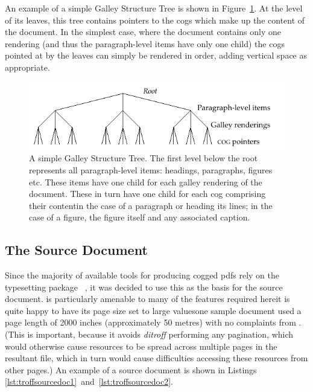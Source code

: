An example of a simple Galley Structure Tree is shown in Figure~\ref{fig:tree}. At the level of its leaves, this tree contains pointers to the \glspl{cog} which make up the content of the document. In the simplest case, where the document contains only one rendering (and thus the pa\-ra\-graph-level items have only one child) the \glspl{cog} pointed at by the leaves can simply be rendered in order, adding vertical space as appropriate.

\begin{figure}
 \includegraphics[width=\textwidth]{gfx/tree}
 \caption[A simple Galley Structure Tree]{A simple Galley Structure Tree. The first level below the root represents all paragraph-level items: headings, paragraphs, figures etc. These items have one child for each galley rendering of the document. These in turn have one child for each \gls{cog} comprising their content\ed{}in the case of a paragraph or heading its lines; in the case of a figure, the figure itself and any associated caption.}
 \label{fig:tree}
\end{figure}

\subsection{The Source Document}\label{sec:srcdoc}
Since the majority of available tools for producing \gls{cog}ged \glspl{pdf} rely on the typesetting package \ditroff{}~\cite{Kernighan1982}, it was decided to use this as the basis for the source document. \Ditroff{} is particularly amenable to many of the features required here\ed{}it is quite happy to have its page size set to large values\ed{}one sample document used a page length of 2000 inches (approximately 50 metres) with no complaints from \ditroff{}. (This is important, because it avoids \emph{ditroff} performing any pagination, which would otherwise cause \COG{} resources to be spread across multiple pages in the resultant \pdf{} file, which in turn would cause difficulties accessing these resources from other pages.) An example of a source document is shown in Listings \ref{lst:troffsourcedoc1}~and~\ref{lst:troffsourcedoc2}.



